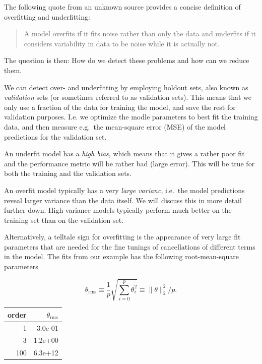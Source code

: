 \documentclass[%
oneside,                 %
final,                   %
10pt]{article}
\begin{document}
The following quote from an unknown source provides a concise definition of overfitting and underfitting:

\begin{quote}
A model overfits if it fits noise rather than only the data and underfits if it considers variability in data to be noise while it is actually not.
\end{quote}


The question is then: How do we detect these problems and how can we reduce them.

We can detect over- and underfitting by employing holdout sets, also known as \emph{validation} sets (or sometimes referred to as validation sets). This means that we only use a fraction of the data for training the model, and save the rest for validation purposes. I.e. we optimize the modle parameters to best fit the training data, and then measure e.g.~the mean-square error (MSE) of the model predictions for the validation set. 

An underfit model has a \emph{high bias}, which means that it gives a rather poor fit and the performance metric will be rather bad (large error). This will be true for both the training and the validation sets.

An overfit model typically has a very \emph{large varianc}, i.e.~the model predictions reveal larger variance than the data itself. We will discuss this in more detail further down. High variance models typically perform much better on the training set than on the validation set. 

Alternatively, a telltale sign for overfitting is the appearance of very large fit parameters that are needed for the fine tunings of cancellations of different terms in the model. The fits from our example has the following root-mean-square parameters

\[
\theta_\mathrm{rms} \equiv \frac{1}{p} \sqrt{ \sum_{i=0}^p \theta_i^2 } \equiv \| \theta \|_2^2 / p.
\]



\begin{tabular}{rr}
\hline
\multicolumn{1}{r}{ order } & \multicolumn{1}{r}{ $\theta_\mathrm{rms}$ } \\
\hline
1     & 3.0e-01               \\
3     & 1.2e+00               \\
100   & 6.3e+12               \\
\hline
\end{tabular}
\end{document}
